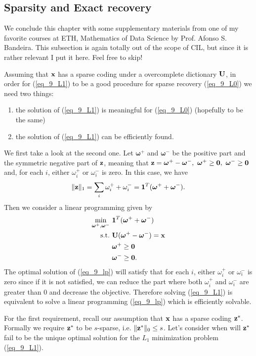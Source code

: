 \documentclass[../main.tex]{subfiles}
\begin{document}
\subsection{Sparsity and Exact recovery}\label{sec_9_comp_sens}
We conclude this chapter with some supplementary materials from one of my favorite courses at ETH, Mathematics of Data Science by Prof. Afonso S. Bandeira. This subsection is again totally out of the scope of CIL, but since it is rather relevant I put it here. Feel free to skip!
\par Assuming that ${\bf x}$ has a sparse coding under a overcomplete dictionary ${\bf U}$, in order for (\ref{eq_9_L1}) to be a good procedure for sparse recovery (\ref{eq_9_L0}) we need two things:
\begin{enumerate}
	\item the solution of (\ref{eq_9_L1}) is meaningful for (\ref{eq_9_L0}) (hopefully to be the same)
	\item the solution of (\ref{eq_9_L1}) can be efficiently found.
\end{enumerate}
We first take a look at the second one. Let $\bm{\omega}^+$ and $\bm{\omega}^-$ be the positive part and the symmetric negative part of ${\bf z}$, meaning that ${\bf z}=\bm{\omega}^+ - \bm{\omega}^-,\ \bm{\omega}^+\geq {\bf 0},\ \bm{\omega}^-\geq {\bf 0}$ and, for each $i$, either $\omega_i^+$ or $\omega_i^-$ is zero. In this case, we have
\begin{equation*}
\|{\bf z}\|_1=\sum_i \omega_i^+ + \omega_i^- = {\bf 1}^T(\bm{\omega}^+ + \bm{\omega}^-).
\end{equation*}
Then we consider a linear programming given by
\begin{align}
\label{eq_9_lp}\min_{\bm{\omega}^+ , \bm{\omega}^-}\ &{\bf 1}^T(\bm{\omega}^+ + \bm{\omega}^-)\\
{\rm s.t.}\ &{\bf U}(\bm{\omega}^+ - \bm{\omega}^-) = {\bf x}\notag\\
& \bm{\omega}^+\geq {\bf 0}\notag\\ 
&\bm{\omega}^-\geq {\bf 0}.\notag
\end{align}
The optimal solution of (\ref{eq_9_lp}) will satisfy that for each $i$, either $\omega_i^+$ or $\omega_i^-$ is zero since if it is not satisfied, we can reduce the part where both $\omega_i^+$ and $\omega_i^-$ are greater than 0 and decrease the objective. Therefore solving (\ref{eq_9_L1}) is equivalent to solve a linear programming (\ref{eq_9_lp}) which is efficiently solvable. 
\par For the first requirement, recall our assumption that ${\bf x}$ has a sparse coding ${\bf z}^*$. Formally we require ${\bf z}^*$ to be $s$-sparse, i.e. $\|{\bf z}^*\|_0\leq s$. Let's consider when will ${\bf z}^*$ fail to be the unique optimal solution for the $L_1$ minimization problem (\ref{eq_9_L1}).
\end{document}
